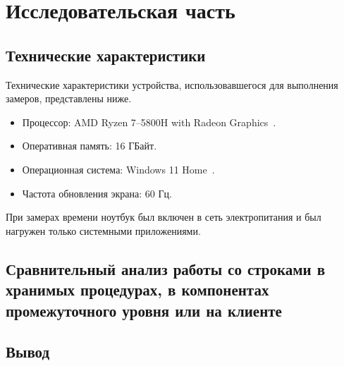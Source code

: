\chapter{Исследовательская часть}


\section{Технические характеристики}

Технические характеристики устройства, использовавшегося для выполнения замеров, представлены ниже.

\begin{itemize}[label=---]
	\item Процессор: AMD Ryzen 7--5800H with Radeon Graphics~\cite{amd_ryzen}.
	\item Оперативная память: 16 ГБайт.
	\item Операционная система: Windows 11 Home~\cite{windows}.
	\item Частота обновления экрана: 60 Гц.
\end{itemize}

При замерах времени ноутбук был включен в сеть электропитания и был нагружен только системными приложениями.

\section{Сравнительный анализ работы со строками в хранимых процедурах, в компонентах промежуточного уровня или на клиенте}
\section*{Вывод}


